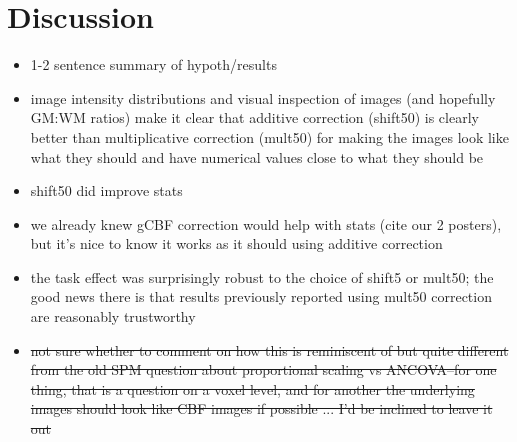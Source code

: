 \section{Discussion}

\begin{itemize}
\item 1-2 sentence summary of hypoth/results
\item image intensity distributions and visual inspection of images (and hopefully GM:WM ratios) make it clear that additive correction (shift50) is clearly better than multiplicative correction (mult50) for making the images look like what they should and have numerical values close to what they should be
\item shift50 did improve stats
\item we already knew gCBF correction would help with stats (cite our 2 posters), but it's nice to know it works as it should using additive correction
\item the task effect was surprisingly robust to the choice of shift5 or mult50; the good news there is that results previously reported using  mult50 correction are reasonably trustworthy
\item \sout{not sure whether to comment on how this is reminiscent of but quite different from the old SPM question about proportional scaling vs ANCOVA--for one thing, that is a question on a voxel level, and for another the underlying images should look like CBF images if possible ... I'd be inclined to leave it out}
\end{itemize}

